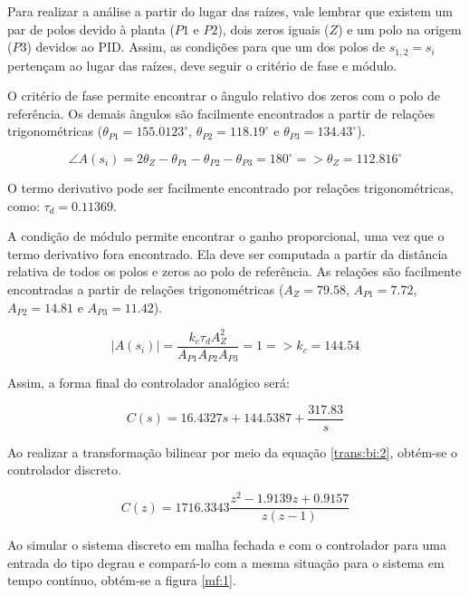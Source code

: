 Para realizar a análise a partir do lugar das raízes, vale lembrar que existem um par de polos devido à planta ($P1$ e $P2$), dois zeros iguais ($Z$) e um polo na origem ($P3$) devidos ao PID. Assim, as condições para que um dos polos de $s_{1,2}=s_i$ pertençam ao lugar das raízes, deve seguir o critério de fase e módulo.

O critério de fase permite encontrar o ângulo relativo dos zeros com o polo de referência. Os demais ângulos são facilmente encontrados a partir de relações trigonométricas ($\theta_{P1} = 155.0123^{\circ}$, $\theta_{P2} = 118.19^{\circ}$ e $\theta_{P3} = 134.43^{\circ}$).

\begin{equation} \label{pid:2}
    \angle A(s_i) = 2 \theta_Z - \theta_{P1} - \theta_{P2} - \theta_{P3} = 180^{\circ} => \theta_Z = 112.816^{\circ}
\end{equation}

O termo derivativo pode ser facilmente encontrado por relações trigonométricas, como: $\tau_d = 0.11369$.

A condição de módulo permite encontrar o ganho proporcional, uma vez que o termo derivativo fora encontrado. Ela deve ser computada a partir da distância relativa de todos os polos e zeros ao polo de referência. As relações são facilmente encontradas a partir de relações trigonométricas ($A_Z = 79.58$, $A_{P1} = 7.72$, $A_{P2} = 14.81$ e $A_{P3} = 11.42$).

\begin{equation} \label{pid:4}
    |A(s_i)| = \frac{k_c \tau_d A_Z^2}{A_{P1} A_{P2} A_{P3}} = 1 => k_c = 144.54
\end{equation}

Assim, a forma final do controlador analógico será:

\begin{equation} \label{pid:5}
    C(s) = 16.4327s+144.5387+\frac{317.83}{s}
\end{equation}

Ao realizar a transformação bilinear por meio da equação \ref{trans:bi:2}, obtém-se o controlador discreto.

\begin{equation} \label{trans:bi:3}
    C(z) = 1716.3343\frac{z^2-1.9139z+0.9157}{z(z-1)}
\end{equation}

Ao simular o sistema discreto em malha fechada e com o controlador para uma entrada do tipo degrau e compará-lo com a mesma situação para o sistema em tempo contínuo, obtém-se a figura \ref{mf:1}.


